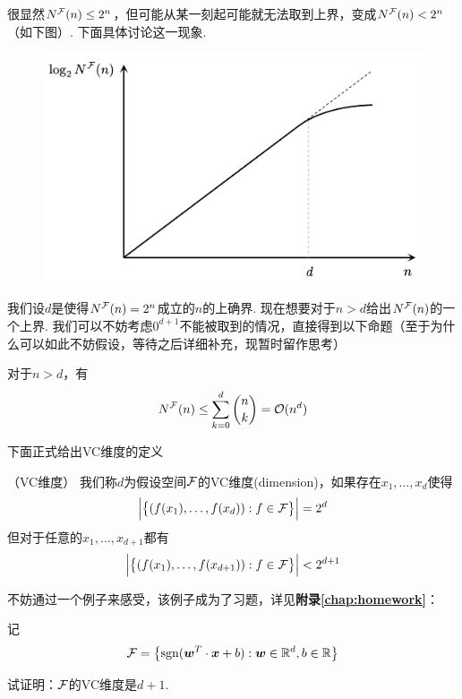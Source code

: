 很显然$N^{\mathcal{F}}(n) \le 2^n$，但可能从某一刻起可能就无法取到上界，变成$N^{\mathcal{F}}(n) < 2^n$（如下图）. 下面具体讨论这一现象.

\begin{figure}[h]
    \centering
    \includegraphics[width=.7\textwidth]{pic/C2_vc-dimension.png}
\end{figure} 

我们设$d$是使得$N^{\mathcal{F}}(n) = 2^n$成立的$n$的上确界. 现在想要对于$n>d$给出$N^{\mathcal{F}}(n)$的一个上界. 我们可以不妨考虑$0^{d+1}$不能被取到的情况，直接得到以下命题（至于为什么可以如此不妨假设，等待之后详细补充，现暂时留作思考）
\begin{proposition}
    对于$n > d$，有 
    \[
    N^{\mathcal{F}}(n) \le \sum_{k=0}^{d} \binom{n}{k} = \mathcal{O}(n^d)
    \]
\end{proposition}

下面正式给出VC维度的定义
\begin{definition} （VC维度）
    我们称$d$为假设空间$\mathcal{F}$的VC维度(dimension)，如果存在$x_1, \dots, x_d$使得 
    \[
    \Big\vert
        \big\{
            (f(x_1), \dots, f(x_d)): f \in \mathcal{F}  
        \big\}
    \Big\vert = 2^d
    \]
    但对于任意的$x_1, \dots, x_{d+1}$都有 
    \[
    \Big\vert
        \big\{
            (f(x_1), \dots, f(x_{d+1})): f \in \mathcal{F}  
        \big\}
    \Big\vert < 2^{d+1}
    \]
\end{definition}

不妨通过一个例子来感受，该例子成为了习题，详见\textbf{附录\ref{chap:homework}}：
\begin{exercise}
    记 
    \[
    \mathcal{F} = \left\{
        \mathrm{sgn}(\boldsymbol{w}^T\cdot \boldsymbol{x} + b): \boldsymbol{w}\in \mathbb{R}^d, b\in \mathbb{R} 
    \right\}
    \]

    试证明：$\mathcal{F}$的VC维度是$d+1$.
\end{exercise}